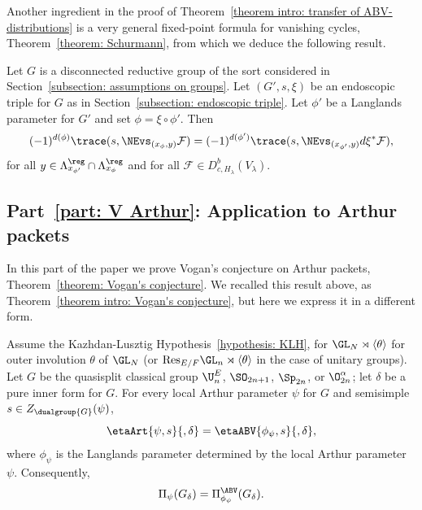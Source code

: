 \documentclass[11pt,letterpaper]{amsart}
\numberwithin{equation}{section}
\begin{document}
Another ingredient in the proof of Theorem~\ref{theorem intro: transfer of ABV-distributions} is a very general fixed-point formula for vanishing cycles, Theorem~\ref{theorem: Schurmann}, from which we deduce the following result.


\begin{theorem}\label{theorem intro: FPF}
Let $G$ is a disconnected reductive group of the sort considered in Section~\ref{subsection: assumptions on groups}.
Let $(G',s,\xi)$ be an endoscopic triple for $G$ as in Section~\ref{subsection: endoscopic triple}.
Let $\phi'$ be a Langlands parameter for $G'$ and set $\phi = \xi \circ \phi'$.
Then
\[
(-1)^{d(\phi)}\trace(s,\NEvs_{(x_{\phi},y)}\mathcal{F})
=
(-1)^{d(\phi')} \trace(s,\NEvs_{(x_{\phi'},y)} d\xi^* \mathcal{F}),
\]
for all $y\in \Lambda_{x_{\phi'}}^\reg \cap \Lambda_{x_\phi}^\reg$ and for all $\mathcal{F}\in D^b_{c,H_\lambda}(V_\lambda)$.
\end{theorem}




\subsection{Part~\ref{part: V Arthur}: Application to Arthur packets}

In this part of the paper we prove Vogan's conjecture on Arthur packets, Theorem~\ref{theorem: Vogan's conjecture}.
We recalled this result above, as Theorem~\ref{theorem intro: Vogan's conjecture}, but here we express it in a different form.

\begin{theorem} Assume the Kazhdan-Lusztig Hypothesis~\ref{hypothesis: KLH}, for $\GL_N\rtimes{\langle\theta\rangle}$ for outer involution $\theta$ of $\GL_N$ (or $\mathrm{Res}_{E/F}\GL_n\rtimes\langle\theta\rangle$ in the case of unitary groups).
Let $G$ be the quasisplit classical group $\U^E_n$, $\SO_{2n+1}$, $\Sp_{2n}$, or $\O^\alpha_{2n}$; let $\delta$ be a pure inner form for $G$.
    For every local Arthur parameter $\psi$ for $G$ and semisimple $s\in Z_{\dualgroup{G}}(\psi)$,
\[
\etaArt{\psi,s}{,\delta}
=
\etaABV{\phi_\psi,s}{,\delta},
\]
where $\phi_\psi$ is the Langlands parameter determined by the local Arthur parameter $\psi$.
Consequently,
\[
\Pi_\psi(G_\delta)
=
\Pi_{\phi_\psi}^\ABV(G_\delta).
\]
\end{theorem}
\end{document}
